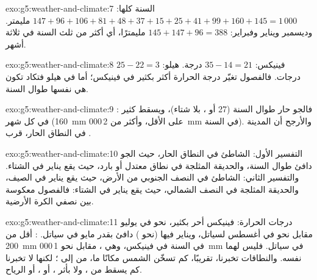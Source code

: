 \begin{solution}{exo:g5:weather-and-climate:7}
السنة كلها: $147 + 96 + 106 + 81 + 48 + 37 + 15 + 25 + 41 + 99 + 160 + 145
= 1\,000$ مليمتر. وديسمبر ويناير وفبراير:
$145 + 147 + 96 = 388$ مليمترًا، أي أكثر من ثلث  السنة في
ثلاثة أشهر.
\end{solution}

\begin{solution}{exo:g5:weather-and-climate:8}
فينيكس: $35 - 14 = 21$ درجة. هيلو: $25 - 22 = 3$ درجات. فالفصول
تغيّر درجة الحرارة أكثر بكثير في فينيكس؛ أما في هيلو فتكاد تكون هي نفسها
طوال السنة.
\end{solution}

\begin{solution}{exo:g5:weather-and-climate:9}
 : فالجو حار طوال السنة (27 أو ، بلا
شتاء)، ويسقط  كثير في كل شهر (160~mm على الأقل، وأكثر
من 2\,000~mm في السنة). والأرجح أن المدينة في النطاق الحار، قرب
.
\end{solution}

\begin{solution}{exo:g5:weather-and-climate:10}
التفسير الأول: الشاطئ في النطاق الحار، حيث الجو دافئ طوال السنة،
والحديقة المثلجة في نطاق معتدل أو بارد، حيث يقع يناير في
الشتاء. والتفسير الثاني: الشاطئ في النصف الجنوبي من الأرض،
حيث يقع يناير في الصيف، والحديقة المثلجة في النصف الشمالي،
حيث يقع يناير في الشتاء: فالفصول معكوسة بين نصفي
الكرة الأرضية.
\end{solution}

\begin{solution}{exo:g5:weather-and-climate:11}
درجات الحرارة: فينيكس أحر بكثير، نحو  في يوليو مقابل
نحو  في أغسطس لسياتل، ويناير فيها (نحو
) دافئ بقدر مايو في سياتل. : أقل من 200~mm في السنة
في فينيكس، وهي ، مقابل نحو 1\,000~mm في سياتل. فليس لهما
 نفسه. والنطاقات تخبرنا، تقريبًا، كم تسخّن الشمس
مكانًا ما، من  إلى ؛ لكنها لا تخبرنا كم يسقط من
، ولا بأثر ، أو ، أو الرياح.
\end{solution}
